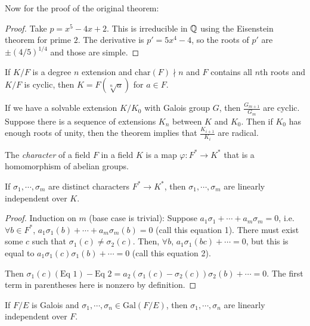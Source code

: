 \documentclass[a4paper,twoside,master.tex]{subfiles}
\begin{document}
Now for the proof of the original theorem:
\begin{proof}
    Take $ p = x^5 - 4x + 2 $. This is irreducible in $ \mathbb{Q} $ using the Eisenstein theorem for prime $ 2 $. The derivative is $ p' = 5x^4 - 4 $, so the roots of $ p' $ are $ \pm(4/5)^{1/4} $ and those are simple.
\end{proof}


\begin{theorem}
    If $ K/F $ is a degree $ n $ extension and $ \text{char}(F) \nmid n $ and $ F $ contains all $ n $th roots and $ K/F $ is cyclic, then $ K = F(\sqrt[n]{a}) $ for $ a \in F $.

    If we have a solvable extension $ K/K_0 $ with Galois group $ G $, then $ \frac{G_{m+1}}{G_m} $ are cyclic. Suppose there is a sequence of extensions $ K_n $ between $ K $ and $ K_0 $. Then if $ K_0 $ has enough roots of unity, then the theorem implies that $ \frac{K_{i+1}}{K_i} $ are radical.
\end{theorem}
\begin{definition}
    The \textit{character} of a field $ F $ in a field $ K $ is a map $ \varphi \colon F^* \to K^* $ that is a homomorphism of abelian groups.
\end{definition}
\begin{lemma}
    If $ \sigma_1, \cdots, \sigma_m $ are distinct characters $ F^* \to K^* $, then $ \sigma_1, \cdots, \sigma_m $ are linearly independent over $ K $.
\end{lemma}

\begin{proof}
    Induction on $ m $ (base case is trivial): Suppose $ a_1 \sigma_1 + \cdots + a_m \sigma_m = 0 $, i.e. $ \forall b \in F^* $, $ a_1 \sigma_1(b) + \cdots + a_m \sigma_m(b) = 0 $ (call this equation 1). There must exist some $ c $ such that $ \sigma_1(c) \neq \sigma_2(c) $. Then, $ \forall b $, $ a_1 \sigma_1(b c) + \cdots = 0 $, but this is equal to $ a_1 \sigma_1(c) \sigma_1(b) + \cdots = 0 $ (call this equation 2).

    Then $ \sigma_1(c) (\text{Eq } 1) - \text{Eq } 2 = a_2 (\sigma_1(c) - \sigma_2(c)) \sigma_2(b) + \cdots = 0 $. The first term in parentheses here is nonzero by definition.
\end{proof}
\begin{corollary}
    If $ F/E $ is Galois and $ \sigma_1, \cdots, \sigma_n \in \text{Gal}(F/E) $, then $ \sigma_1, \cdots, \sigma_n $ are linearly independent over $ F $. 
\end{corollary}
\end{document}

